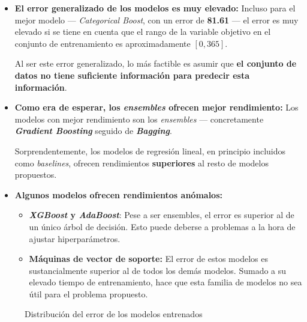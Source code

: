 \begin{itemize}[leftmargin=*, parsep=1pt, itemsep=2pt, topsep=1pt]
	\item \textbf{El error generalizado de los modelos es muy elevado:} Incluso para el mejor modelo --- \textit{Categorical Boost}, con un error de \textbf{81.61} --- el error es muy elevado si se tiene en cuenta que el rango de la variable objetivo en el conjunto de entrenamiento es aproximadamente $[0, 365]$.
	
	Al ser este error generalizado, lo más factible es asumir que \textbf{el conjunto de datos no tiene suficiente información para predecir esta información}.
	\item \textbf{Como era de esperar, los \textit{ensembles} ofrecen mejor rendimiento:} Los modelos con mejor rendimiento son los \textit{ensembles} --- concretamente \textbf{\textit{Gradient Boosting}} seguido de \textbf{\textit{Bagging}}.
	
	Sorprendentemente, los modelos de regresión lineal, en principio incluidos como \textit{baselines}, ofrecen rendimientos \textbf{superiores} al resto de modelos propuestos.
	\item \textbf{Algunos modelos ofrecen rendimientos anómalos:}
	\begin{itemize}
		\item \textbf{\textit{XGBoost} y \textit{AdaBoost}}: Pese a ser ensembles, el error es superior al de un único árbol de decisión. Esto puede deberse a problemas a la hora de ajustar hiperparámetros.
		\item \textbf{Máquinas de vector de soporte:} El error de estos modelos es sustancialmente superior al de todos los demás modelos. Sumado a su elevado tiempo de entrenamiento, hace que esta familia de modelos no sea útil para el problema propuesto.
	\end{itemize}
\end{itemize}

\begin{figure}[h]
	\vspace{-6mm}
	\centering
	\captionsetup{belowskip=-5pt, justification=centering}
	\caption{Distribución del error de los modelos entrenados}
	\label{fig:ch5valerror}
\end{figure}

